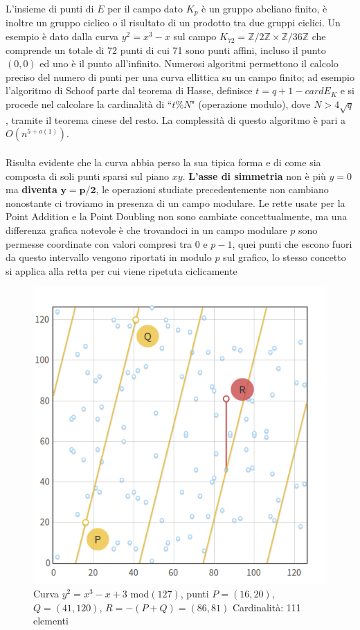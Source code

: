 \documentclass[a4paper,12pt]{tesiinfo}
\begin{document}
L'insieme di punti di $E$ per il campo dato $K_p$ \`e un gruppo abeliano finito, \`e inoltre un gruppo ciclico o il risultato di un prodotto tra due gruppi ciclici. Un esempio \`e dato dalla curva $y^2 = x^3 - x$ sul campo $K_{72} = \mathbb{Z}/2\mathbb{Z}\times\mathbb{Z}/36\mathbb{Z}$ che comprende un totale di 72 punti di cui 71 sono punti affini, incluso il punto $(0,0)$ ed uno \`e il punto all'infinito.
Numerosi algoritmi permettono il calcolo preciso del numero di punti per una curva ellittica su un campo finito; ad esempio l'algoritmo di Schoof parte dal teorema di Hasse, definisce $t = q+1-cardE_K$ e si procede nel calcolare la cardinalit\`a di ``$t\%N$" (operazione modulo), dove $N > 4\sqrt{q}$, tramite il teorema cinese del resto. La complessit\`a di questo algoritmo \`e pari a $O(n^{5+o(1)})$.
\\
%
\\
Risulta evidente che la curva abbia perso la sua tipica forma e di come sia composta di soli punti sparsi sul piano $xy$. 
\textbf{L'asse di simmetria} non \`e pi\`u $y=0$ ma \textbf{diventa} $\mathbold{y=p\big / 2}$, le operazioni studiate precedentemente non cambiano nonostante ci troviamo in presenza di un campo modulare. Le rette usate per la Point Addition e la Point Doubling non sono cambiate concettualmente, ma una differenza grafica notevole \`e che trovandoci in un campo modulare $p$ sono permesse coordinate con valori compresi tra $0$ e $p-1$, quei punti che escono fuori da questo intervallo vengono riportati in modulo $p$ sul grafico, lo stesso concetto si applica alla retta per cui viene ripetuta ciclicamente
\begin{figure}[H]
  \includegraphics[width=.6\textwidth,center]{ECmodPA}
  \caption{Curva $y^2=x^3-x+3$ mod$(127)$, punti $P = (16, 20)$, $Q=(41, 120)$, $R = -(P+Q) = (86, 81)$ Cardinalit\`a: 111 elementi}
\end{figure}
\end{document}
